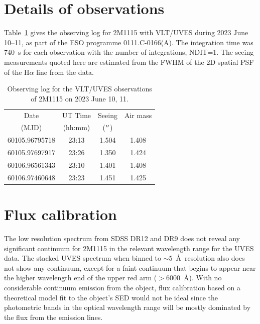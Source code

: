 \documentclass{aa}
\newcommand{\Ha}{\ensuremath{\mathrm{H}\alpha}\xspace}
\begin{document}
\begin{appendix}
\section{Details of observations}

Table~\ref{aptab1} gives the observing log for 2M1115 with VLT/UVES during 2023 June 10--11, as part of the ESO programme 0111.C-0166(A).  The integration time was 740~s for each observation with the number of integrations, NDIT=1. The seeing measurements quoted here are estimated from the FWHM of the 2D spatial PSF of the \Ha line from the data.

\begin{table}[!htb]
\centering
\caption{Observing log for the VLT/UVES observations of 2M1115 on 2023 June 10, 11.} 
\begin{tabular}{c c c c}
\hline\hline
Date & UT Time & Seeing & Air mass \\
(MJD) & (hh:mm) & ($^{\prime\prime}$) & \\
\hline 
   60105.96795718 & 23:13 & 1.504 & 1.408 \\
   60105.97697917 & 23:26 & 1.350 & 1.424 \\
   60106.96561343 & 23:10 & 1.401 & 1.408 \\
   60106.97460648 & 23:23 & 1.451 & 1.425 \\
\hline
\end{tabular}
\label{aptab1} 
\end{table}


\section{Flux calibration}\label{apendixb}
The low resolution spectrum from SDSS DR12 \citep{sdss12} and DR9 \citep{sdss9} does not reveal any significant continuum for 2M1115 in the relevant wavelength range for the UVES data. The stacked UVES spectrum when binned to $\sim5$~\AA\ resolution also does not show any continuum, except for a faint continuum that begins to appear near the higher wavelength end of the upper red arm ($>6000$~\AA). With no considerable continuum emission from the object, flux calibration based on a theoretical model fit to the object's SED would not be ideal since the photometric bands in the optical wavelength range will be mostly dominated by the flux from the emission lines. 


\end{appendix}
\end{document}
